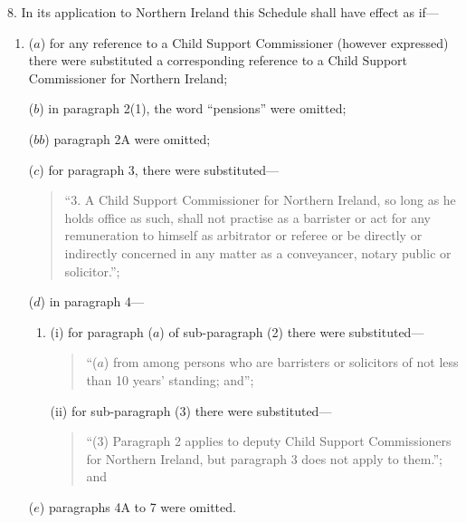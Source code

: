\documentclass[12pt,a4paper]{article}
\begin{document}
8. In its application to Northern Ireland this Schedule shall have effect as if—
\begin{enumerate}\item[]
($a$) for any reference to a Child Support Commissioner (however expressed) there were substituted a corresponding reference to a Child Support Commissioner for Northern Ireland;


($b$) in paragraph 2(1), the word “pensions” were omitted;

($bb$) paragraph 2A were omitted;

($c$) for paragraph 3, there were substituted—
\begin{quotation}
“3. A Child Support Commissioner for Northern Ireland, so long as he holds office as such, shall not practise as a barrister or act for any remuneration to himself as arbitrator or referee or be directly or indirectly concerned in any matter as a conveyancer, notary public or solicitor.”;
\end{quotation}

($d$) in paragraph 4—
\begin{enumerate}\item[]

(i) for paragraph ($a$)  of sub-paragraph (2)  there were substituted—
\begin{quotation}
“($a$) from among persons who are barristers or solicitors of not less than 10 years' standing; and”;
\end{quotation}


(ii) for sub-paragraph (3)  there were substituted—
\begin{quotation}
“(3) Paragraph 2 applies to deputy Child Support Commissioners for Northern Ireland, but paragraph 3 does not apply to them.”; and
\end{quotation}
\end{enumerate}

($e$) 
paragraphs 4A  %
to 7 were omitted.
\end{enumerate}
\end{document}
